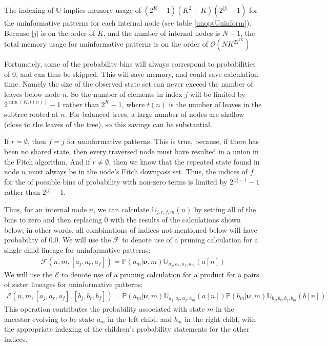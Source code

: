 \documentclass[11pt]{article}
\newcommand{\edgeLengths}{\ensuremath{\bm \nu}\xspace}
\newcommand{\patProbSym}{\ensuremath{\mathbb P}\xspace}
\renewcommand{\Pr}{\patProbSym}
\newcommand{\probUninformPatClassSym}{\ensuremath{\mathbb U}\xspace}
\newcommand{\probUninformPatClass}[5]{\ensuremath{\probUninformPatClassSym_{#1,#2,#3,#4}\left(#5\right)}\xspace}
\newcommand{\leftChild}[1]{\ensuremath{a\left[#1\right]}\xspace} %
\newcommand{\rightChild}[1]{\ensuremath{b\left[#1\right]}\xspace}%
\newcommand{\numLeaves}[1]{\ensuremath{t\left(#1\right)}\xspace}
\newcommand{\order}{{\mathcal{O}}}
\newcommand{\FelsensteinPruneSym}{{\mathcal{F}}}
\newcommand{\FelsensteinPruneUninform}[5]{\FelsensteinPruneSym(#1,#2,\left[#3,#4,#5\right])}
\newcommand{\DoubleFelsensteinPruneSym}{{\mathcal{E}}}
\newcommand{\DoubleFelsensteinPruneUninform}[8]{\DoubleFelsensteinPruneSym(#1,#2,\left[#3,#4,#5\right],\left[#6,#7,#8\right])}
\begin{document}
The indexing of $\probUninformPatClassSym$ implies memory usage of $\left(2^K-1\right)\left(K^2 + K\right)\left(2^{|j|}-1\right)$ for the uninformative patterns for each internal node (see table \ref{unoptUninform}).
Because $|j|$ is on the order of $K$, and the number of internal nodes is $N - 1$, the total memory usage for uninformative patterns is on the order of $\order\left(NK^22^{2K}\right)$

Fortunately, some of the probability bins will always correspond to probabilities of 0, and can thus be skipped. 
This will save memory, and could save calculation time.
Namely the size of the observed state set can never exceed the number of leaves below node $n$.  
So the number of elements in index $j$ will be limited by $2^{\min(K,\numLeaves{n})}-1$ rather than $2^K-1$, where $\numLeaves{n}$ is the number of leaves in the subtree rooted at $n$.
For balanced trees, a large number of nodes are shallow (close to the leaves of the tree), so this savings can be substantial.

If $r=\emptyset$, then $f=j$ for uninformative patterns.
This is true, because, if there has been no shared state, then every traversed node must have resulted in a union in the Fitch algorithm.
And if $r\neq\emptyset$, then we know that the repeated state found in node $n$ must always be in the node's Fitch downpass set.
Thus, the indices of $f$ for the of possible bins of probability with non-zero terms is limited by $2^{|j|-1}-1$ rather than $2^{|j|}-1$.

Thus, for an internal node $n$,  we can calculate \probUninformPatClass{j}{r}{f}{m}{n} by setting all of the bins to zero and then replacing 0 with the results of the calculations shown below; in other words, all combinations of indices not mentioned below will have probability of 0.0.
We will use the $\FelsensteinPruneSym$ to denote use of a pruning calculation for a single child lineage for uninformative patterns:
\begin{eqnarray}
	\FelsensteinPruneUninform{n}{m}{a_j}{a_r}{a_f} = \Pr(a_m|\edgeLengths, m)\probUninformPatClass{a_j}{a_r}{a_f}{a_m}{\leftChild{n}}
\end{eqnarray}
We will use the $\DoubleFelsensteinPruneSym$ to denote use of a pruning calculation for a product for a pairs of sister lineages for uninformative patterns:
\begin{eqnarray}
	\DoubleFelsensteinPruneUninform{n}{m}{a_j}{a_r}{a_f}{b_j}{b_r}{b_f} = \Pr(a_m|\edgeLengths, m)\probUninformPatClass{a_j}{a_r}{a_f}{a_m}{\leftChild{n}}\Pr(b_m|\edgeLengths, m)\probUninformPatClass{b_j}{b_r}{b_f}{b_m}{\rightChild{n}}
\end{eqnarray}
This operation contributes the probability associated with state $m$ in the ancestor evolving to be state $a_m$ in the left child, and $b_m$ in the right child, with the appropriate indexing of the children's probability statements for the other indices.
\end{document}

